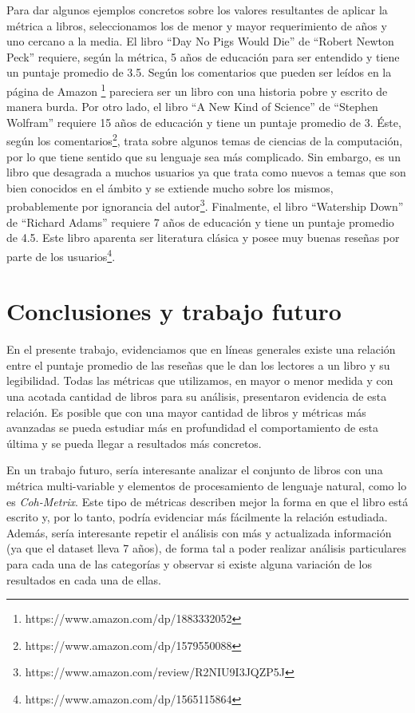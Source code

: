 \documentclass[12pt,journal,compsoc]{IEEEtran}
\begin{document}
Para dar algunos ejemplos concretos sobre los valores resultantes de aplicar la métrica a libros, seleccionamos los de menor y mayor requerimiento de años y uno cercano a la media. El libro ``Day No Pigs Would Die'' de ``Robert Newton Peck'' requiere, según la métrica, 5 años de educación para ser entendido y tiene un puntaje promedio de 3.5. Según los comentarios que pueden ser leídos en la página de Amazon \footnote{https://www.amazon.com/dp/1883332052} pareciera ser un libro con una historia pobre y escrito de manera burda. Por otro lado, el libro ``A New Kind of Science'' de ``Stephen Wolfram'' requiere 15 años de educación y tiene un puntaje promedio de 3. Éste, según los comentarios\footnote{https://www.amazon.com/dp/1579550088}, trata sobre algunos temas de ciencias de la computación, por lo que tiene sentido que su lenguaje sea más complicado. Sin embargo, es un libro que desagrada a muchos usuarios ya que trata como nuevos a temas que son bien conocidos en el ámbito y se extiende mucho sobre los mismos, probablemente por ignorancia del autor\footnote{https://www.amazon.com/review/R2NIU9I3JQZP5J}. Finalmente, el libro ``Watership Down'' de ``Richard Adams'' requiere 7 años de educación y tiene un puntaje promedio de 4.5. Este libro aparenta ser literatura clásica y posee muy buenas reseñas por parte de los usuarios\footnote{https://www.amazon.com/dp/1565115864}.


\section{Conclusiones y trabajo futuro}\label{sec:conclusion} 

En el presente trabajo, evidenciamos que en líneas generales existe una relación entre el puntaje promedio de las reseñas que le dan los lectores a un libro y su legibilidad. Todas las métricas que utilizamos, en mayor o menor medida y con una acotada cantidad de libros para su análisis, presentaron evidencia de esta relación. Es posible que con una mayor cantidad de libros y métricas más avanzadas se pueda estudiar más en profundidad el comportamiento de esta última y se pueda llegar a resultados más concretos.

En un trabajo futuro, sería interesante analizar el conjunto de libros con una métrica multi-variable y elementos de procesamiento de lenguaje natural, como lo es \textit{Coh-Metrix}\cite{graesser}. Este tipo de métricas describen mejor la forma en que el libro está escrito y, por lo tanto, podría evidenciar más fácilmente la relación estudiada. Además, sería interesante repetir el análisis con más y actualizada información (ya que el dataset lleva 7 años), de forma tal a poder realizar análisis particulares para cada una de las categorías y observar si existe alguna variación de los resultados en cada una de ellas.
\end{document}

